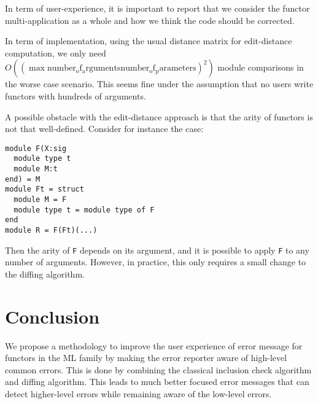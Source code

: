 \documentclass[a4paper,11pt]{scrartcl}
\begin{document}
In term of user-experience, it is important to report that we consider the
functor multi-application as a whole and how we think the code should be corrected.

In term of implementation, using the usual distance matrix for edit-distance computation, we only need
$O((\max \mathrm{number_of_arguments} \mathrm{number_of_parameters} )^2)$ module comparisons in the worse case
scenario.
This seems fine under the assumption that no users write functors with hundreds of arguments.

A possible obstacle with the edit-distance approach is that the arity of functors is not that well-defined.
Consider for instance the case:
\begin{verbatim}
module F(X:sig
  module type t
  module M:t
end) = M
module Ft = struct
  module M = F
  module type t = module type of F
end
module R = F(Ft)(...)
\end{verbatim}
Then the arity of \texttt{F} depends on its argument, and it is possible to apply \texttt{F} to
any number of arguments. However, in practice, this only requires a small change to the diffing
algorithm.

\section{Conclusion}

We propose a methodology to improve the user experience of error message for functors in the ML family by making
the error reporter aware of high-level common errors. This is done by combining the classical
inclusion check algorithm and diffing algorithm. This leads to much better focused error messages
that can detect higher-level errors while remaining aware of the low-level errors.
\end{document}

